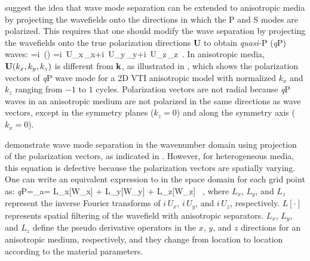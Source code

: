 \cite{GEO55-07-09140919} suggest the idea that wave mode separation 
can be extended to anisotropic media by projecting the wavefields onto
the directions in which the P and S modes are polarized. This requires
that one should modify the wave separation  by projecting the
wavefields onto the true polarization directions {\textbf U} to obtain
{\it quasi-}P ({\it q}P) waves:
\beq\label{AniDivK}
\WqP=i\, \UU(\kk) \cdot \WWK 
=i\, U_x\,\WK_x+i\, U_y\,\WK_y+i\, U_z\,\WK_z\, .                
\eeq
In anisotropic media, $\mathbf U(k_x,k_y,k_z)$ is different from $\mathbf k$, as
illustrated in , which shows the polarization
vectors of {\it q}P wave mode for a 2D VTI anisotropic model with normalized
$k_x$ and $k_z$ ranging from $-1$ to $1$ cycles. Polarization vectors are
not radial because {\it q}P waves in an anisotropic medium are not
polarized in the same directions as wave vectors, except in the
symmetry planes ($k_z=0$) and along the symmetry axis ($k_x=0$).

\cite{GEO55-07-09140919} demonstrate wave mode separation in 
the wavenumber domain using projection of the polarization vectors,
as indicated in . However, for heterogeneous media, this
equation is defective because the polarization vectors are spatially
varying. One can write an equivalent expression to  in
the space domain for each grid point as:
\beq\label{AniDivX}
{\it q}P=\nabla_a\cdot \WW     = L_x[W_x] 
                      + L_y[W_y] 
                      + L_z[W_z] \, ,
\eeq
where $L_x$, $L_y$, and $L_z$ represent the inverse Fourier transforms
of $i\, U_x$, $i\, U_y$, and $i\, U_z$, respectively.
$L\left[\cdot\right]$ represents spatial {filtering of the wavefield
with anisotropic separators}.  $L_x$, $L_y$, and $L_z$ define the
pseudo derivative operators in the $x$, $y$, and $z$ directions for an
anisotropic medium, respectively, and they change from location to
location according to the material parameters.

